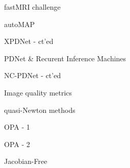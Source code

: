 \begin{frame}{fastMRI challenge}
    
\end{frame}

\begin{frame}{autoMAP}
    
\end{frame}

\begin{frame}{XPDNet - ct'ed}
    
\end{frame}

\begin{frame}{PDNet \& Recurent Inference Machines}
    
\end{frame}

\begin{frame}{NC-PDNet - ct'ed}
    
\end{frame}

\begin{frame}{Image quality metrics}
    
\end{frame}

\begin{frame}{quasi-Newton methods}
    
\end{frame}

\begin{frame}{OPA - 1}
    
\end{frame}

\begin{frame}{OPA - 2}
    
\end{frame}

\begin{frame}{Jacobian-Free}
    
\end{frame}